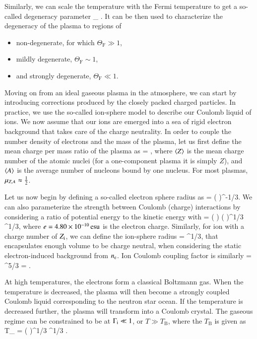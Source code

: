 Similarly, we can scale the temperature with the Fermi temperature to get a so-called degeneracy parameter
\be\label{eq:Thetar}
\Theta_{} \equiv {}.
\ee
It can be then used to characterize the degeneracy of the plasma to regions of 
\begin{itemize}
    \item non-degenerate, for which $\Theta_{\mathrm{F}} \gg 1$,
    \item mildly degenerate, $\Theta_{\mathrm{F}} \sim 1$,
    \item and strongly degenerate, $\Theta_{\mathrm{F}} \ll 1$.
\end{itemize}


Moving on from an ideal gaseous plasma in the atmosphere, we can start by introducing corrections produced by the closely packed charged particles.
In practice, we use the so-called ion-sphere model to describe our Coulomb liquid of ions.
We now assume that our ions are emerged into a sea of rigid electron background that takes care of the charge neutrality.
In order to couple the number density of electrons and the mass of the plasma, let us first define the mean charge per mass ratio of the plasma as
\be
\Mu = ,
\ee
where $\langle Z \rangle$ is the mean charge number of the atomic nuclei (for a one-component plasma it is simply $Z$), and $\langle A \rangle$ is the average number of nucleons bound by one nucleus.
For most plasmas, $\mu_{Z,A} \approx \frac{1}{2}$.

Let us now begin by defining a so-called electron sphere radius as
\be
\erad = \left(  \right)^{-1/3}.
\ee
We can also parameterize the strength between Coulomb (charge) interactions by considering a ratio of potential energy to the kinetic energy with
\be
\Ge =   \left(  \right) \left(  \right)^{1/3} \Mu^{1/3},
\ee
where $e = 4.80 \times 10^{-10} \, \mathrm{esu}$ is the electron charge.
Similarly, for ion with a charge number of $Z_{\mathrm{i}}$, we can define the ion-sphere radius
\be
\irad = \erad \Zi^{1/3},
\ee
that encapsulates enough volume to be charge neutral, when considering the static electron-induced background from $n_{\mathrm{e}}$.
Ion Coulomb coupling factor is similarly
\be
\Gi = \Ge \Zi^{5/3} = .
\ee

At high temperatures, the electrons form a classical Boltzmann gas.
When the temperature is decreased, the plasma will then become a strongly coupled Coulomb liquid corresponding to the neutron star ocean.
If the temperature is decreased further, the plasma will transform into a Coulomb crystal. %
The gaseous regime can be constrained to be at $\Gamma_{\mathrm{i}} \ll 1$, or $T \gg T_{\mathrm{B}}$, where the $T_{\mathrm{B}}$ is given as
\be
T_{} =  \approx {} \left(  \right)^{1/3} \Mu^{1/3} \Kelvin.
\ee

